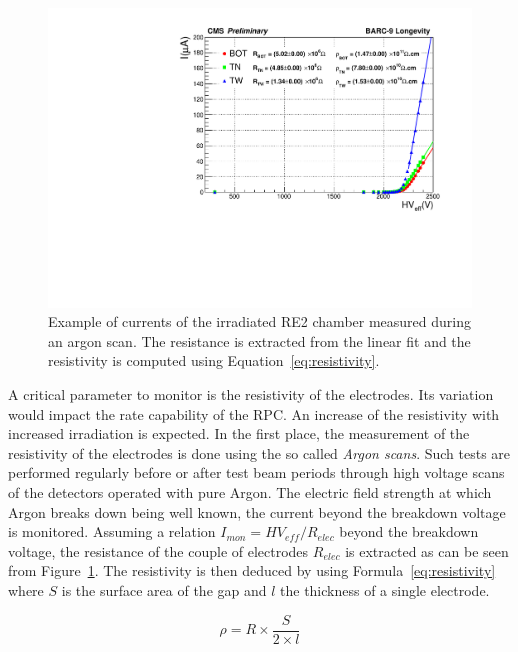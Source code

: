 	\begin{figure}
		\centering
    	\includegraphics[width = \linewidth]{fig/chapt5/Argon-Scan.pdf}
		\caption{\label{fig:argon-scan} Example of currents of the irradiated RE2 chamber measured during an argon scan. The resistance is extracted from the linear fit and the resistivity is computed using Equation~\ref{eq:resistivity}.}
	\end{figure}
	
	A critical parameter to monitor is the resistivity of the electrodes. Its variation would impact the rate capability of the RPC. An increase of the resistivity with increased irradiation is expected. In the first place, the measurement of the resistivity of the electrodes is done using the so called \textit{Argon scans}. Such tests are performed regularly before or after test beam periods through high voltage scans of the detectors operated with pure Argon. The electric field strength at which Argon breaks down being well known, the current beyond the breakdown voltage is monitored. Assuming a relation $I_{mon} = HV_{eff}/R_{elec}$ beyond the breakdown voltage, the resistance of the couple of electrodes $R_{elec}$ is extracted as can be seen from Figure~\ref{fig:argon-scan}. The resistivity is then deduced by using Formula~\ref{eq:resistivity} where $S$ is the surface area of the gap and $l$ the thickness of a single electrode.
	
\endgroup
	
	\begin{equation}
	\label{eq:resistivity}
	\rho = R \times \frac{S}{2 \times l}
	\end{equation}
	
